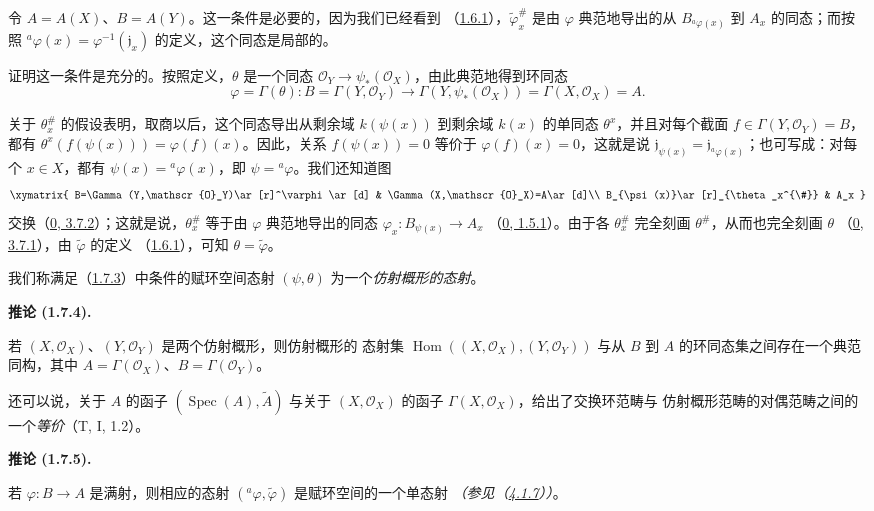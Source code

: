 \documentclass[UTF8,fontset=none,11pt,oneside,openany]{ctexbook}
\newenvironment{corollary}[1][]{%
  \par\medskip\noindent\textbf{推论 (#1).}\ %
}{\par}
\newcommand{\oldpage}[2][]{%
  \hypertarget{ega-source-page-#1-#2}{}%
  \marginnote{\scriptsize\textbf{#1}~|~#2}\ignorespaces}
\let\EGAOriginalLabel\label
\renewcommand{\label}[1]{\phantomsection\EGAOriginalLabel{#1}}
\begin{document}
\oldpage[I]{97}
令 $A=A(X)$、$B=A(Y)$。这一条件是必要的，因为我们已经看到
（\hyperref[I.1.6.1-fr]{1.6.1}），$\widetilde\varphi_x^{\#}$ 是由
$\varphi$ 典范地导出的从 $B_{{}^a\varphi(x)}$ 到 $A_x$ 的同态；而按照
${}^a\varphi(x)=\varphi^{-1}(\mathfrak{j}_x)$ 的定义，这个同态是局部的。

证明这一条件是充分的。按照定义，$\theta$ 是一个同态
$\mathscr{O}_Y\to\psi_*(\mathscr{O}_X)$，由此典范地得到环同态
\[
  \varphi=\Gamma(\theta):
  B=\Gamma(Y,\mathscr{O}_Y)
  \longrightarrow
  \Gamma(Y,\psi_*(\mathscr{O}_X))=\Gamma(X,\mathscr{O}_X)=A.
\]

关于 $\theta_x^{\#}$ 的假设表明，取商以后，这个同态导出从剩余域
$k(\psi(x))$ 到剩余域 $k(x)$ 的单同态 $\theta^x$，并且对每个截面
$f\in\Gamma(Y,\mathscr{O}_Y)=B$，都有
$\theta^x(f(\psi(x)))=\varphi(f)(x)$。因此，关系 $f(\psi(x))=0$ 等价于
$\varphi(f)(x)=0$，这就是说
$\mathfrak{j}_{\psi(x)}=\mathfrak{j}_{{}^a\varphi(x)}$；也可写成：对每个
$x\in X$，都有 $\psi(x)={}^a\varphi(x)$，即 $\psi={}^a\varphi$。我们还知道图
\label{I.1.7.3.diagram-fr}
\[
  \xymatrix{
    B=\Gamma(Y,\mathscr{O}_Y)\ar[r]^\varphi\ar[d] &
    \Gamma(X,\mathscr{O}_X)=A\ar[d]\\
    B_{\psi(x)}\ar[r]_{\theta_x^{\#}} & A_x
  }
\]
交换（\hyperref[0.3.7.2-fr]{0, 3.7.2}）；这就是说，$\theta_x^{\#}$ 等于由
$\varphi$ 典范地导出的同态 $\varphi_x:B_{\psi(x)}\to A_x$
（\hyperref[0.1.5.1-fr]{0, 1.5.1}）。由于各 $\theta_x^{\#}$ 完全刻画
$\theta^{\#}$，从而也完全刻画 $\theta$
（\hyperref[0.3.7.1-fr]{0, 3.7.1}），由 $\widetilde\varphi$ 的定义
（\hyperref[I.1.6.1-fr]{1.6.1}），可知 $\theta=\widetilde\varphi$。

我们称满足（\hyperref[I.1.7.3-fr]{1.7.3}）中条件的赋环空间态射
$(\psi,\theta)$ 为一个\emph{仿射概形的态射}。

\begin{corollary}[1.7.4]
\label{I.1.7.4-fr}
若 $(X,\mathscr{O}_X)$、$(Y,\mathscr{O}_Y)$ 是两个仿射概形，则仿射概形的
态射集 $\operatorname{Hom}((X,\mathscr{O}_X),(Y,\mathscr{O}_Y))$ 与从 $B$
到 $A$ 的环同态集之间存在一个典范同构，其中
$A=\Gamma(\mathscr{O}_X)$、$B=\Gamma(\mathscr{O}_Y)$。
\end{corollary}

还可以说，关于 $A$ 的函子 $(\operatorname{Spec}(A),\widetilde A)$ 与关于
$(X,\mathscr{O}_X)$ 的函子 $\Gamma(X,\mathscr{O}_X)$，给出了交换环范畴与
仿射概形范畴的对偶范畴之间的一个\emph{等价}（T, I, 1.2）。

\begin{corollary}[1.7.5]
\label{I.1.7.5-fr}
若 $\varphi:B\to A$ 是满射，则相应的态射
$({}^a\varphi,\widetilde\varphi)$ 是赋环空间的一个单态射
\emph{（参见（\hyperref[I.4.1.7-fr]{4.1.7}））}。
\end{corollary}
\end{document}
